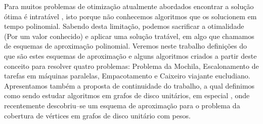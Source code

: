 Para muitos problemas de otimização atualmente abordados encontrar a solução ótima é intratável , isto porque não conhecemos algoritmos que os solucionem em tempo polinomial. Sabendo desta limitação, podemos sacrificar a otimalidade (Por um valor conhecido) \cite{Vignatti} e aplicar uma solução tratável, em algo que chamamos de esquemas de aproximação polinomial. Veremos neste trabalho definições do que são estes esquemas de aproximação e alguns algoritmos criados a partir deste conceito para resolver quatro problemas: Problema da Mochila, Escalonamento de tarefas em máquinas paralelas, Empacotamento e Caixeiro viajante eucludiano. Apresentamos também a proposta de continuidade do trabalho, a qual definimos como sendo estudar algoritmos em grafos de disco unitários, em especial \cite{li}, onde recentemente descobriu--se um esquema de aproximação para o problema da cobertura de vértices em grafos de disco unitário com pesos.